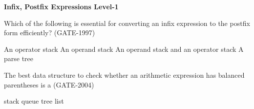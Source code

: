 \centerline{\textbf{ \LARGE Infix, Postfix Expressions Level-1}}

\begin{questyle}
  \question  Which of the following is essential for converting an infix expression to the postfix form efficiently?  (GATE-1997)

  \begin{choices}
    \CorrectChoice  An operator stack
    \choice         An operand stack
    \choice         An operand stack and an operator stack
    \choice         A parse tree
  \end{choices}
\end{questyle}


\begin{questyle}
  \question  The best data structure to check whether an arithmetic expression has balanced parentheses is a  (GATE-2004)

  \begin{choices}
    \CorrectChoice  stack
    \choice         queue
    \choice         tree
    \choice         list
  \end{choices}
\end{questyle}
